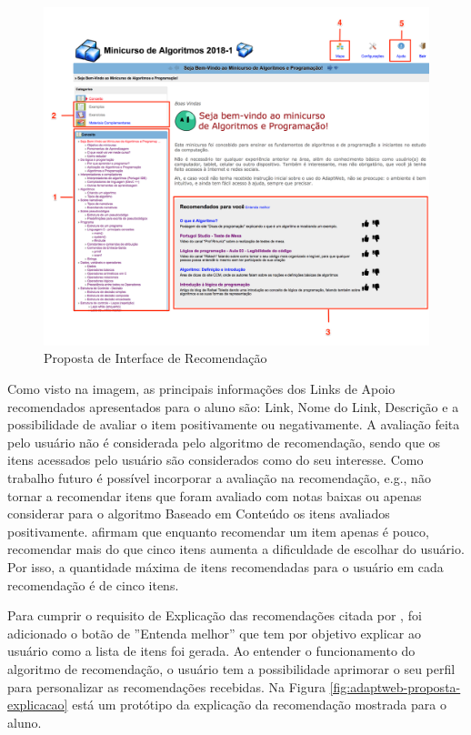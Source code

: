 \begin{figure}[htb]
  \caption{\label{fig:adaptweb-proposta-recomendacao}Proposta de Interface de Recomendação}
  \begin{center}
      \includegraphics[scale=0.4]{./Figuras/interface-recomendacao.png}
  \end{center}
\end{figure}

Como visto na imagem, as principais informações dos Links de Apoio recomendados apresentados para o aluno são: Link, Nome do Link, Descrição e a possibilidade de avaliar o item
positivamente ou negativamente. A avaliação feita pelo usuário não é considerada pelo algoritmo de recomendação, sendo que os itens acessados pelo
usuário são considerados como do seu interesse. Como trabalho futuro é possível incorporar a avaliação na recomendação, e.g.,
não tornar a recomendar itens que foram avaliado com notas baixas ou apenas considerar para o algoritmo Baseado em Conteúdo
os itens avaliados positivamente.  afirmam que enquanto recomendar um item apenas é pouco, recomendar mais do que cinco itens
aumenta a dificuldade de escolhar do usuário. Por isso, a quantidade máxima de itens recomendadas para o usuário em cada
recomendação é de cinco itens.

Para cumprir o requisito de Explicação das recomendações citada por , foi adicionado o
botão de ''Entenda melhor'' que tem por objetivo explicar ao usuário como a lista de itens foi gerada. Ao entender o
funcionamento do algoritmo de recomendação, o usuário tem a possibilidade aprimorar o seu perfil para personalizar as
recomendações recebidas. Na Figura \ref{fig:adaptweb-proposta-explicacao} está um protótipo da explicação da recomendação
mostrada para o aluno.


